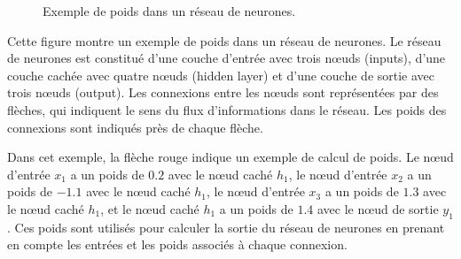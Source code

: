 \documentclass{article}
\begin{document}
\begin{figure}[h]
\centering
{}
\caption{Exemple de poids dans un réseau de neurones.}
\end{figure}


Cette figure montre un exemple de poids dans un réseau de neurones. Le réseau de neurones est constitué d'une couche d'entrée avec trois nœuds (inputs), d'une couche cachée avec quatre nœuds (hidden layer) et d'une couche de sortie avec trois nœuds (output). Les connexions entre les nœuds sont représentées par des flèches, qui indiquent le sens du flux d'informations dans le réseau. Les poids des connexions sont indiqués près de chaque flèche.

Dans cet exemple, la flèche rouge indique un exemple de calcul de poids. Le nœud d'entrée $x_1$ a un poids de $0.2$ avec le nœud caché $h_1$, le nœud d'entrée $x_2$ a un poids de $-1.1$ avec le nœud caché $h_1$, le nœud d'entrée $x_3$ a un poids de $1.3$ avec le nœud caché $h_1$, et le nœud caché $h_1$ a un poids de $1.4$ avec le nœud de sortie $y_1$. Ces poids sont utilisés pour calculer la sortie du réseau de neurones en prenant en compte les entrées et les poids associés à chaque connexion.
\end{document}
